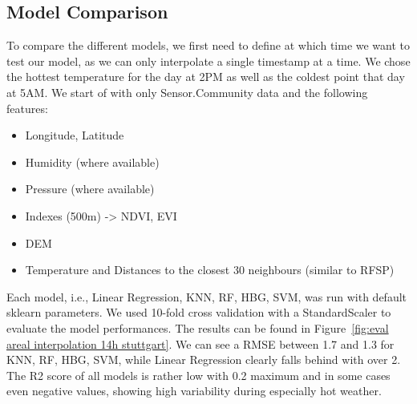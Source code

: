 \subsection{Model Comparison}

To compare the different models, we first need to define at which time we want to test our model, as we can only interpolate a single timestamp at a time. We chose the hottest temperature for the day at 2PM as well as the coldest point that day at 5AM. We start of with only Sensor.Community data and the following features:

\begin{itemize}
  \item Longitude, Latitude
  \item Humidity (where available)
  \item Pressure (where available)
  \item Indexes (500m) ->  NDVI, EVI
  \item DEM
  \item Temperature and Distances to the closest 30 neighbours (similar to RFSP)
\end{itemize}

Each model, i.e., Linear Regression, KNN, RF, HBG, SVM, was run with default sklearn parameters. We used 10-fold cross validation with a StandardScaler to evaluate the model performances. The results can be found in Figure~\ref{fig:eval areal interpolation 14h stuttgart}. We can see a RMSE between 1.7 and 1.3 for KNN, RF, HBG, SVM, while Linear Regression clearly falls behind with over 2. The R2 score of all models is rather low with 0.2 maximum and in some cases even negative values, showing high variability during especially hot weather.\\

